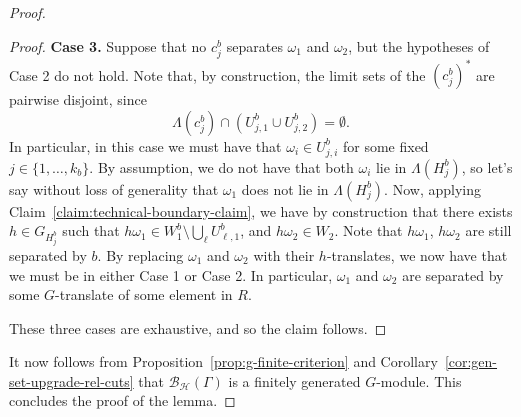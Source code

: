 \documentclass[10pt,a4paper]{amsart}
\newcommand{\br}{{\mathscr{B}}}
\newcommand{\per}{\mathcal{H}}
\begin{document}
\begin{proof}
\begin{proof}
        \textbf{Case 3.} Suppose that no $c_j^b$ separates $\omega_1$ and $\omega_2$, but the hypotheses of Case 2 do not hold. Note that, by construction, the limit sets of the $(c_{j}^b)^\ast$ are pairwise disjoint, since
        $$
        \Lambda(c^b_j) \cap (U_{j,1}^b \cup U_{j,2}^b) = \emptyset.
        $$
        In particular, in this case we must have that $\omega_i \in U_{j,i}^b$ for some fixed $j \in \{1, \ldots, k_b\}$. By assumption, we do not have that both $\omega_i$ lie in $\Lambda(H_j^b)$, so let's say without loss of generality that $\omega_1$ does not lie in $\Lambda(H_j^b)$. Now, applying Claim~\ref{claim:technical-boundary-claim}, we have by construction that there exists $h \in G_{H_j^b}$ such that $h \omega_1 \in W_1^b \setminus \bigcup _\ell U_{\ell,1}^b$, and $h \omega_2 \in W_2$. Note that $h\omega_1$, $h\omega_2$ are still separated by $b$. By replacing $\omega_1$ and $\omega_2$ with their $h$-translates, we now have that we must be in either Case 1 or Case 2. In particular, $\omega_1$ and $\omega_2$ are separated by some $G$-translate of some element in $R$. 

        These three cases are exhaustive, and so the claim follows.
        \end{proof}
        
        It now follows from Proposition~\ref{prop:g-finite-criterion} and Corollary~\ref{cor:gen-set-upgrade-rel-cuts} that $\br_\per(\Gamma)$ is a finitely generated $G$-module. This concludes the proof of the lemma. 
    \end{proof}
\end{document}
